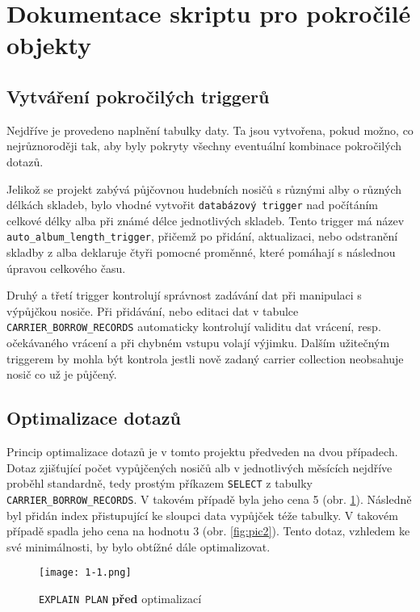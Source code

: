 \section{Dokumentace skriptu pro pokročilé objekty}

\subsection{Vytváření pokročilých triggerů}
Nejdříve je provedeno naplnění tabulky daty. Ta jsou vytvořena, pokud možno, co nejrůznoroději tak,
aby byly pokryty všechny eventuální kombinace pokročilých dotazů.

Jelikož se projekt zabývá půjčovnou hudebních nosičů s různými alby o různých délkách skladeb,
bylo vhodné vytvořit \texttt{databázový trigger} nad počítáním celkové délky alba při známé délce jednotlivých skladeb. 
Tento trigger má název \texttt{auto\_album\_length\_trigger}, přičemž po přidání, 
aktualizaci, nebo odstranění skladby z alba deklaruje čtyři pomocné proměnné, které pomáhají s následnou úpravou celkového času.

Druhý a třetí trigger kontrolují správnost zadávání dat při manipulaci s výpůjčkou nosiče. Při přidávání,
nebo editaci dat v tabulce \texttt{CARRIER\_BORROW\_RECORDS} automaticky kontrolují validitu dat vrácení, 
resp. očekávaného vrácení a při chybném vstupu volají výjimku.
Dalším užitečným triggerem by mohla být kontrola jestli nově zadaný carrier collection neobsahuje nosič co už je půjčený.



\subsection{Optimalizace dotazů}
Princip optimalizace dotazů je v tomto projektu předveden na dvou případech. 
Dotaz zjišťující počet vypůjčených nosičů alb v jednotlivých měsících nejdříve proběhl standardně,
tedy prostým příkazem \texttt{SELECT} z tabulky \texttt{CARRIER\_BORROW\_RECORDS}. 
V takovém případě byla jeho cena 5 (obr. \ref{fig:pic1}). 
Následně byl přidán index přistupující ke sloupci data vypůjček téže tabulky. 
V takovém případě spadla jeho cena na hodnotu 3 (obr. \ref{fig:pic2}). 
Tento dotaz, vzhledem ke své minimálnosti, by bylo obtížné dále optimalizovat.

\begin{figure}[h]
    \centering
    \caption{\texttt{EXPLAIN PLAN} \textbf{před} optimalizací}
    \label{fig:pic1}

    \texttt{[image: 1-1.png]}
\end{figure}

